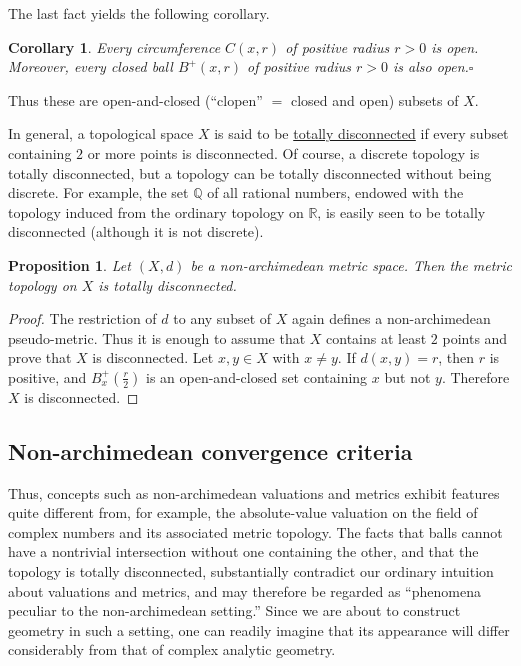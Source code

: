 \documentclass[a4paper,12pt, dvipdfmx]{jsbook}
\def\Q{\mathbb{Q}}
\def\R{\mathbb{R}}
\theoremstyle{plain}
\newtheorem{prop}[thm]{\bfseries Proposition}
\newtheorem{cor}[thm]{\bfseries Corollary}
\theoremstyle{definition}
\begin{document}
The last fact yields the following corollary.
\begin{cor}\label{cor-nonarchimportant1}{\rm 
Every circumference $C(x,r)$ of positive radius $r>0$ is open.
Moreover, every closed ball $B^+(x,r)$ of positive radius $r>0$ is also open.}\hfill$\square$
\end{cor}

Thus these are open-and-closed (``clopen'' $=$ closed and open) subsets of $X$.

In general, a topological space $X$ is said to be \underline{totally disconnected} if every subset containing $2$ or more points is disconnected.
Of course, a discrete topology is totally disconnected, but a topology can be totally disconnected without being discrete.
For example, the set $\Q$ of all rational numbers, endowed with the topology induced from the ordinary topology on $\R$, is easily seen to be totally disconnected (although it is not discrete).

\begin{prop}\label{prop-nonarchtotallydisconnected}{\rm 
Let $(X,d)$ be a non-archimedean metric space.
Then the metric topology on $X$ is totally disconnected.}
\end{prop}

\begin{proof}[Proof]
The restriction of $d$ to any subset of $X$ again defines a non-archimedean pseudo-metric. Thus it is enough to assume that $X$ contains at least $2$ points and prove that $X$ is disconnected.
Let $x,y\in X$ with $x\neq y$.
If $d(x,y)=r$, then $r$ is positive, and $B^+_x(\frac{r}{2})$ is an open-and-closed set containing $x$ but not $y$.
Therefore $X$ is disconnected.
\end{proof}

\subsection{Non-archimedean convergence criteria}\label{sub-convergencenonarchimedean}
Thus, concepts such as non-archimedean valuations and metrics exhibit features quite different from, for example, the absolute-value valuation on the field of complex numbers and its associated metric topology.
The facts that balls cannot have a nontrivial intersection without one containing the other, and that the topology is totally disconnected, substantially contradict our ordinary intuition about valuations and metrics, and may therefore be regarded as ``phenomena peculiar to the non-archimedean setting.''
Since we are about to construct geometry in such a setting, one can readily imagine that its appearance will differ considerably from that of complex analytic geometry.
\end{document}
